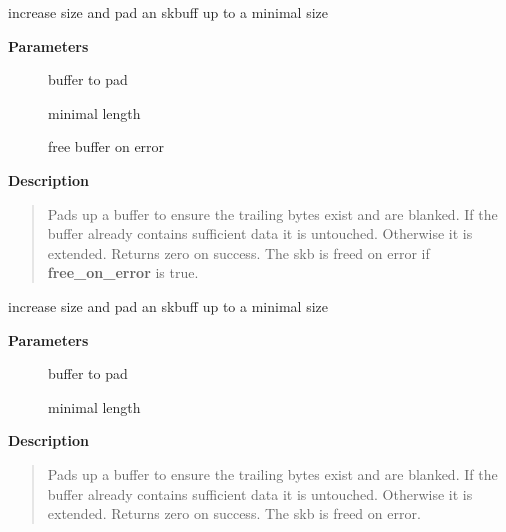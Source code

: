 \documentclass[a4paper,8pt,english]{sphinxmanual}
\begin{document}
\begin{fulllineitems}
\label{networking/kapi:c.__skb_put_padto}
increase size and pad an skbuff up to a minimal size

\end{fulllineitems}


\textbf{Parameters}
\begin{description}
\item[{}] \leavevmode
buffer to pad

\item[{}] \leavevmode
minimal length

\item[{}] \leavevmode
free buffer on error

\end{description}

\textbf{Description}
\begin{quote}

Pads up a buffer to ensure the trailing bytes exist and are
blanked. If the buffer already contains sufficient data it
is untouched. Otherwise it is extended. Returns zero on
success. The skb is freed on error if \textbf{free\_on\_error} is true.
\end{quote}

\begin{fulllineitems}
\label{networking/kapi:c.skb_put_padto}
increase size and pad an skbuff up to a minimal size

\end{fulllineitems}


\textbf{Parameters}
\begin{description}
\item[{}] \leavevmode
buffer to pad

\item[{}] \leavevmode
minimal length

\end{description}

\textbf{Description}
\begin{quote}

Pads up a buffer to ensure the trailing bytes exist and are
blanked. If the buffer already contains sufficient data it
is untouched. Otherwise it is extended. Returns zero on
success. The skb is freed on error.
\end{quote}
\end{document}
